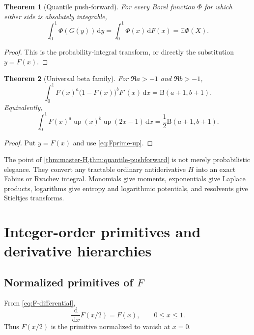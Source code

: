 \documentclass[11pt,oneside]{article}
\newtheorem{theorem}{Theorem}[section]
\theoremstyle{definition}
\theoremstyle{remark}
\newcommand{\E}{\mathbb E}
\newcommand{\dd}{\,\mathrm d}
\newcommand{\upf}{\operatorname{up}}
\begin{document}
\begin{theorem}[Quantile push-forward]\label{thm:quantile-pushforward}
For every Borel function $\Phi$ for which either side is absolutely integrable,
\begin{equation}\label{eq:quantile-pushforward}
 \int_0^1\Phi(G(y))\dd y
 =\int_0^1\Phi(x)\dd F(x)
 =\E\Phi(X).
\end{equation}
\end{theorem}

\begin{proof}
This is the probability-integral transform, or directly the substitution $y=F(x)$.
\end{proof}

\begin{theorem}[Universal beta family]\label{thm:beta-family}
For $\Re a>-1$ and $\Re b>-1$,
\begin{equation}\label{eq:beta-family}
 \int_0^1F(x)^a\bigl(1-F(x)\bigr)^bF'(x)\dd x
 =\mathrm B(a+1,b+1).
\end{equation}
Equivalently,
\begin{equation}\label{eq:beta-up-family}
 \int_0^1F(x)^a\upf(x)^b\upf(2x-1)\dd x
 =\frac12\mathrm B(a+1,b+1).
\end{equation}
\end{theorem}

\begin{proof}
Put $y=F(x)$ and use \eqref{eq:Fprime-up}.
\end{proof}

The point of \cref{thm:master-H,thm:quantile-pushforward} is not merely probabilistic elegance.  They convert any tractable ordinary antiderivative $H$ into an exact Fabius or Rvachev integral.  Monomials give moments, exponentials give Laplace products, logarithms give entropy and logarithmic potentials, and resolvents give Stieltjes transforms.

\section{Integer-order primitives and derivative hierarchies}

\subsection{Normalized primitives of $F$}

From \eqref{eq:F-differential},
\begin{equation}\label{eq:first-primitive-F}
 \frac{\dd}{\dd x}F(x/2)=F(x),
 \qquad 0\le x\le1.
\end{equation}
Thus $F(x/2)$ is the primitive normalized to vanish at $x=0$.
\end{document}
